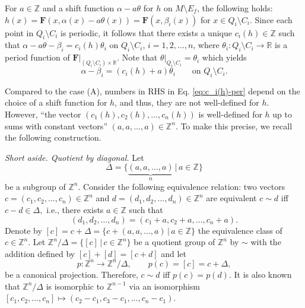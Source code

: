 \documentclass[10pt,reqno]{amsart}
\newcommand{\bbR}{\mathbb{R}}
\newcommand{\bbZ}{\mathbb{Z}}
\newcommand{\bfF}{\mathbf{F}}
\begin{document}
For $a\in \bbZ$ and  a shift function $\alpha-a\theta$ for $h$ on $M\setminus E_f$,
the following holds: $h(x) = \bfF(x,\alpha(x) -a\theta(x)) = \bfF(x,\beta_i(x))$ for $x\in Q_i\setminus C_i$. Since each point in $Q_i\setminus C_i$ is periodic, it follows  that
there exists a unique $c_i(h)\in \bbZ$ such that $\alpha -a\theta-\beta_i = c_i(h)\theta_i$ on $Q_i\setminus C_i$, $i = 1,2,\ldots, n$, where $\theta_i:Q_i\setminus C_i\to \bbR$ is a period function of $\bfF|_{(Q_i\setminus C_i)\times\bbR}$.
 Note that  $\theta|_{Q_i\setminus C_i} = \theta_i$ which yields
\begin{equation}\label{eq:c_i(h)-per}
	\alpha -\beta_i = (c_i(h)+a)\theta_i\qquad \text{on }Q_i\setminus C_i.
\end{equation}

Compared to the case (A), numbers in RHS in Eq. \eqref{eq:c_i(h)-per} depend on the choice of a shift function  for $h$, and
thus, they are not well-defined for $h$. However, ``the vector  $(c_1(h),c_2(h),\ldots, c_n(h))$ is well-defined for $h$ up to  sums with  constant vectors'' $(a,a,\ldots, a)\in\bbZ^n$.
To make this precise, we recall the following construction.

{\it Short aside. Quotient by diagonal.}
Let 
$$
\Delta = \{\underbrace{(a,a,\ldots, a)}_{n}\,|\,a\in\bbZ\}
$$ be a subgroup of $\bbZ^n$.
Consider the following equivalence relation:
two vectors $c = (c_1,c_2,\ldots, c_n)\in\bbZ^n$ and $d = (d_1,d_2,\ldots, d_n)\in\bbZ^n$ are equivalent  $c\sim d$ iff $c-d\in \Delta,$ i.e., there exists $a\in \bbZ$ such that 
$$
(d_1,d_2,\ldots, d_n) = (c_1+a,c_2+a,\ldots, c_n+a).
$$
Denote by $[c] = c+\Delta = \{c+(a,a,\ldots, a)\,|\,a\in \bbZ\}$ the equivalence class of $c\in \bbZ^n$. Let $\bbZ^n/\Delta = \{ [c] \,|\, c\in \bbZ^n\}$ be a quotient group of $\bbZ^n$ by $\sim$ with the addition defined by $[c] + [d]= [c+d]$ and let 
$$
p:\bbZ^n\to \bbZ^n/\Delta,\qquad p(c) = [c] = c+\Delta,
$$
be a canonical projection. Therefore, $c\sim d$ iff $p(c) = p(d).$
 It is also known that $\bbZ^n/\Delta$ is isomorphic to $\bbZ^{n-1}$ via an isomorphism $[c_1,c_2,\ldots, c_n]\mapsto (c_2-c_1, c_3-c_1, \ldots, c_n-c_1)$.
 
\end{document}
